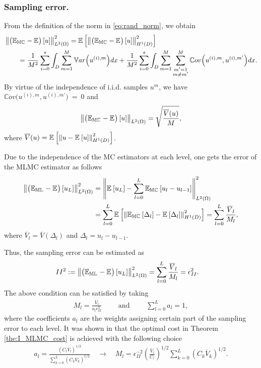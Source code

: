 \subsubsection{Sampling error.}
	From the definition of the norm in \eqref{eq:rand_norm}, we obtain
	\begin{align*}
		&\left\|  \big( \mathbb{E_{MC}}_{{}} - \mathbb{E}_{{}} \big) \left[ {u} \right]  \right\|_{L^2(\Omega)}^2
		=
		\mathbb{E}_{{}} \left[ { \left\|  \big( \mathbb{E_{MC}}_{{}} - \mathbb{E}_{{}} \big) \left[ {u} \right]  \right\|_{H^1(D)}^2 } \right]
		\\
		&\qquad
		=
		\frac{1}{M^2} \sum_{i=0}^s \int_D \sum_{m=1}^M \mathbb{V}ar \Big( u^{(i),m} \Big) d {x}
		+ \frac{1}{M^2} \sum_{i=0}^s \int_D \sum_{m=1}^M \sum_{\substack{m'=1 \\ m \neq m'}}^M \mathbb{C}ov \Big( u^{(i),m},u^{(i),m'} \Big) d {x}.
	\end{align*}
	By virtue of the independence of i.i.d. samples $u^m$, we have $\mathbb{C}ov \Big( u^{(i),m},u^{(i),m'} \Big)~=~0$ and
	\begin{align}\label{eq:MC_error}
		\left\|  \big( \mathbb{E_{MC}}_{{}} - \mathbb{E}_{{}} \big) \left[ {u} \right]  \right\|_{L^2(\Omega)}
		=
		\sqrt{ \frac{\overline{V} ( u )}{M}   },
	\end{align}	
	where $\overline{V} ( u ) = \mathbb{E}_{{}} \left[ { \left\|  u - \mathbb{E}_{{}} \left[ {u} \right]  \right\|_{H^1(D)}^2 } \right]$.

Due to the independence of the MC estimators at each level, one gets the error of the MLMC estimator as follows
\begin{align*}
	\left\|  \big( \mathbb{E_{ML}}_{{}} - \mathbb{E}_{{}} \big) \left[ { u_{L}} \right]  \right\|_{L^2(\Omega)}^2
	&= \left\|  \mathbb{E}_{{}} \left[ { u_{L}} \right] - \sum_{l=0}^L \mathbb{E_{MC}}_{{}} \left[ { u_{l} - u_{{l-1}} } \right]  \right\|_{L^2(\Omega)}^2
	\\ \nonumber
	& = \sum_{l=0}^L \mathbb{E}_{{}} \left[ { \left\|  \mathbb{E_{MC}}_{{}} \left[ { \Delta_{l} } \right] - \mathbb{E}_{{}} \left[ { \Delta_{l} } \right]  \right\|_{H^1(D)}^2 } \right]
	 =
	\sum_{l=0}^L \frac{\overline{V}_l}{M_l},
\end{align*}
where $\overline{V}_l=\overline{V}(\Delta_{l})$ and $\Delta_{l}=u_{l} - u_{{l-1}}$.

Thus, the sampling error can be estimated as
\begin{align} \label{eq:sampling_err}
	II^2 &:=
	\left\|  \big( \mathbb{E_{ML}}_{{}} - \mathbb{E}_{{}} \big) \left[ { u_{L}} \right]  \right\|_{L^2(\Omega)}^2
	=
	\sum_{l=0}^L \frac{\overline{V}_l}{M_l}
	= \epsilon_{II}^2.
\end{align}
The above condition can be satisfied by taking
\begin{align*}
	M_l = \frac{ \overline{V}_l }{ a_l \epsilon_{II}^2 }
	\qquad
	\text{ and }
	\qquad
	\sum_{l=0}^L a_l = 1,
\end{align*}
where the coefficients $a_l$ are the weights assigning certain part of the sampling error to each level.
It was shown in \cite{Giles2008} that the optimal cost in Theorem \ref{the:I_MLMC_cost} is achieved with the following choice
\begin{align}\label{eq:num_samples}
	a_l 
	= 
	\frac{({C_l} \overline{V}_l )^{1/2} }{ \displaystyle{\sum_{k=0}^L ( {C_k} \overline{V}_k )^{1/2} }}
	\quad
	\to
	\quad
	M_l = \epsilon_{II}^{-2} \left( \frac{ \overline{V}_l }{ C_l  } \right)^{1/2} \sum_{k=0}^L ( {C_k} \overline{V}_k )^{1/2}.
\end{align}

